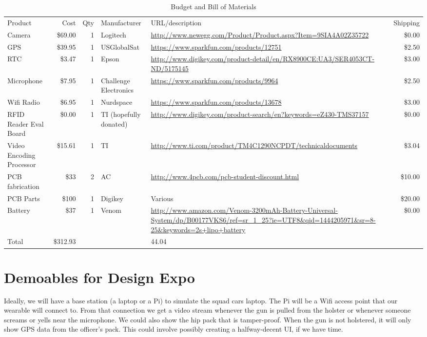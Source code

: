 \documentclass[12pt]{article}
\begin{document}
\begin{table}[h!]
    \centering
    \caption{Budget and Bill of Materials}
    \begin{tabular}{|lrrllr|}
        Product & Cost & Qty & Manufacturer & URL/description & Shipping\\
        Camera & \$69.00 & 1 & Logitech & \url{http://www.newegg.com/Product/Product.aspx?Item=9SIA4A02Z35722} & \$0.00\\
        GPS & \$39.95 & 1 & USGlobalSat & \url{https://www.sparkfun.com/products/12751} & \$2.50\\
        RTC & \$3.47 & 1 & Epson & \url{http://www.digikey.com/product-detail/en/RX8900CE:UA3/SER4053CT-ND/5175145} & \$3.00\\
        Microphone & \$7.95 & 1 & Challenge Electronics & \url{https://www.sparkfun.com/products/9964} & \$2.50\\
        Wifi Radio & \$6.95 & 1 & Nurdspace & \url{https://www.sparkfun.com/products/13678} & \$3.00\\
        RFID Reader Eval Board & \$0.00 & 1 & TI (hopefully donated) & \url{http://www.digikey.com/product-search/en?keywords=eZ430-TMS37157} & \$0.00\\
        Video Encoding Processor & \$15.61 & 1 & TI & \url{http://www.ti.com/product/TM4C1290NCPDT/technicaldocuments} & \$3.04\\
        PCB fabrication & \$33 & 2 & AC & \url{http://www.4pcb.com/pcb-student-discount.html} & \$10.00\\
        PCB Parts & \$100 & 1 & Digikey & Various & \$20.00\\
        Battery & \$37 & 1 & Venom & \url{http://www.amazon.com/Venom-3200mAh-Battery-Universal-System/dp/B00177VKS6/ref=sr_1_25?ie=UTF8&qid=1444205971&sr=8-25&keywords=2s+lipo+battery} & \$0.00\\
        Total & \$312.93 & & & 44.04\\
    \end{tabular}
\end{table}

\section{Demoables for Design Expo}

Ideally, we will have a base station (a laptop or a Pi) to simulate the squad
cars laptop. The Pi will be a Wifi access point that our wearable will connect
to. From that connection we get a video stream whenever the gun is pulled from
the holster or whenever someone screams or yells near the microphone. We could
also show the hip pack that is tamper-proof. When the gun is not holstered, it
will only show GPS data from the officer’s pack. This could involve possibly
creating a halfway-decent UI, if we have time.
\end{document}
